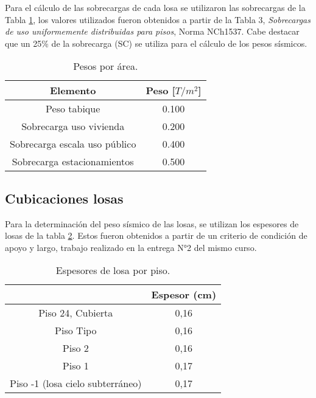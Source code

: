 \documentclass[letterpaper,11pt]{article} %
\begin{document}
Para el cálculo de las sobrecargas de cada losa se utilizaron las sobrecargas de la Tabla \ref{Area}, los valores utilizados fueron obtenidos a partir de la Tabla 3, \textit{Sobrecargas de uso uniformemente distribuidas para pisos}, Norma NCh1537. Cabe destacar que un 25\% de la sobrecarga (SC) se utiliza para el cálculo de los pesos sísmicos.

\begin{table}[H]
  \centering
  \caption{Pesos por área.}
    \begin{tabular}{|c|c|}
    \hline
    \textbf{Elemento} & \boldmath{}\textbf{Peso [$T/m^2$]}\unboldmath{} \bigstrut\\
    \hline
    Peso tabique & 0.100 \bigstrut\\
    \hline
    Sobrecarga uso vivienda & 0.200 \bigstrut\\
    \hline
    Sobrecarga escala uso público & 0.400 \bigstrut\\
    \hline
    Sobrecarga estacionamientos & 0.500 \bigstrut\\
    \hline
    \end{tabular}%
  \label{Area}%
\end{table}
            
\newpage
\subsection{Cubicaciones losas}

    Para la determinación del peso sísmico de las losas, se utilizan los espesores de losas de la tabla \ref{Espesor losas}. Estos fueron obtenidos a partir de un criterio de condición de apoyo y largo, trabajo realizado en la entrega N°2 del mismo curso.
    
    \begin{table}[H]
      \centering
      \caption{Espesores de losa por piso.}
        \begin{tabular}{|c|c|}
    \cline{2-2}    \multicolumn{1}{c|}{} &
          \textbf{Espesor (cm)}
          \bigstrut\\
        \hline
        Piso 24, Cubierta &
          0,16
          \bigstrut[t]\\
        Piso Tipo  &
          0,16
          \\
        Piso 2  &
          0,16
          \\
        Piso 1 &
          0,17
          \\
        Piso -1 (losa cielo subterráneo) &
          0,17
          \bigstrut[b]\\
        \hline
        \end{tabular}%
      \label{Espesor losas}%
    \end{table}%
    
\end{document}
